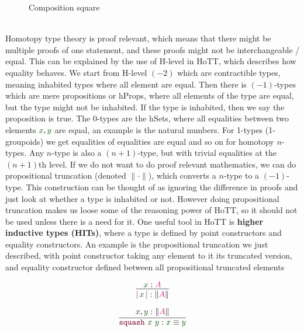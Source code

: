 \documentclass[twoside,11pt,openright]{report}
\theoremstyle{plain} %
\theoremstyle{definition}
\theoremstyle{remark}
\newcommand*{\term}[1]{\textcolor{green!30!black}{#1}} %
\newcommand*{\pathterm}[1]{\textcolor{green!65!red!75!black}{#1}}
\newcommand*{\type}[1]{\textcolor{magenta!90!black}{#1}}
\newcommand*{\constructor}[1]{\textcolor{purple!60!black}{\ensuremath{\mathtt{#1}}}}
\newcommand{\ct}{%
  \mathchoice{\mathbin{\raisebox{0.5ex}{$\displaystyle\centerdot$}}}%
             {\mathbin{\raisebox{0.5ex}{$\centerdot$}}}%
             {\mathbin{\raisebox{0.25ex}{$\scriptstyle\,\centerdot\,$}}}%
             {\mathbin{\raisebox{0.1ex}{$\scriptscriptstyle\,\centerdot\,$}}}
}
\begin{document}
\begin{figure}[h]
  \centering
  \caption{Composition square}
  \label{fig:cubical-composition-square}
\end{figure}
\\ 
Homotopy type theory is proof relevant, which means that there might be multiple proofs of one statement, and these proofs might not be interchangeable / equal. This can be explained by the use of H-level in HoTT, which describes how equality behaves. We start from H-level \((-2)\) which are contractible types, meaning inhabited types where all element are equal. Then there is \((-1)\)-types which are mere propositions or hProps, where all elements of the type are equal, but the type might not be inhabited. If the type is inhabited, then we say the proposition is true. The 0-types are the hSets, where all equalities between two elements \(\term{x},\term{y}\) are equal, an example is the natural numbers. For 1-types (1-groupoids) we get equalities of equalities are equal and so on for homotopy \(n\)-types. Any \(n\)-type is also a \((n+1)\)-type, but with trivial equalities at the \((n+1)\)th level. If we do not want to do proof relevant mathematics, we can do propositional truncation (denoted \(\|{\cdot}\|\)), which converts a \(n\)-type to a \((-1)\)-type. This construction can be thought of as ignoring the difference in proofs and just look at whether a type is inhabited or not. However doing propositional truncation makes us loose some of the reasoning power of HoTT, so it should not be used unless there is a need for it. One useful tool in HoTT is \textbf{higher inductive types (HITs)}, where a type is defined by point constructors and equality constructors. An example is the propositional truncation we just described, with point constructor taking any element to it its truncated version, and equality constructor defined between all propositional truncated elements\\[-9mm]
\begin{center}
  \strut
  \hfill
  \begin{minipage}[b]{0.25\linewidth}
    \begin{equation}
      \vcenter{\infer{\constructor{|}\,\term{x}\,\constructor{|} : \| \type{A} \|}{\term{x} : \type{A}}}
    \end{equation}
  \end{minipage}
  \hfill
  \begin{minipage}[b]{0.3\linewidth}
    \begin{equation}
      \vcenter{\infer{\constructor{squash}~\term{x}~\term{y} : \term{x} \equiv \term{y}}{\term{x}, \term{y} : \|\type{A}\|}}
    \end{equation}
  \end{minipage}
  \hfill
  \strut
\end{center}
\end{document}
